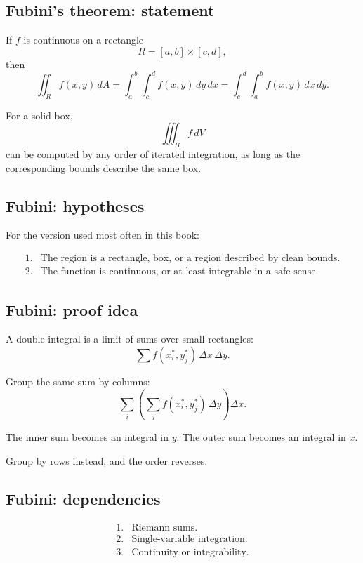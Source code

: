 \subsection*{Fubini's theorem: statement}

If \(f\) is continuous on a rectangle
\[
    R=[a,b]\times[c,d],
\]
then
\[
\boxed{
    \iint_R f(x,y)\,dA
    =
    \int_a^b\int_c^d f(x,y)\,dy\,dx
    =
    \int_c^d\int_a^b f(x,y)\,dx\,dy.
}
\]

For a solid box,
\[
\boxed{
    \iiint_B f\,dV
}
\]
can be computed by any order of iterated integration, as long as the corresponding
bounds describe the same box.

\subsection*{Fubini: hypotheses}

For the version used most often in this book:

\[
\begin{array}{ll}
1. & \text{The region is a rectangle, box, or a region described by clean bounds.}\\[1mm]
2. & \text{The function is continuous, or at least integrable in a safe sense.}
\end{array}
\]

\subsection*{Fubini: proof idea}

A double integral is a limit of sums over small rectangles:
\[
    \sum f(x_i^*,y_j^*)\,\Delta x\,\Delta y.
\]

Group the same sum by columns:
\[
    \sum_i
    \left(
        \sum_j f(x_i^*,y_j^*)\,\Delta y
    \right)
    \Delta x.
\]

The inner sum becomes an integral in \(y\).  The outer sum becomes an integral in
\(x\).

Group by rows instead, and the order reverses.

\subsection*{Fubini: dependencies}

\[
\begin{array}{ll}
1. & \text{Riemann sums.}\\[1mm]
2. & \text{Single-variable integration.}\\[1mm]
3. & \text{Continuity or integrability.}
\end{array}
\]

